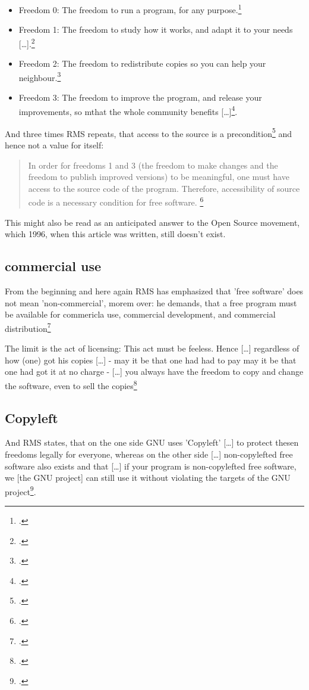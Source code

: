 \documentclass[DIV=calc,BCOR=5mm,11pt,headings=small,oneside,abstract=true, toc=bib]{scrartcl}
\begin{document}
\begin{itemize}
  \item \glqq{}Freedom 0: The freedom to run a program, for any
  purpose.\grqq{}\footcite[cf][41]{Stallman1996a}
  \item \glqq{}Freedom 1: The freedom to study how it works, and adapt it
  to your needs [\ldots].\grqq{}\footcite[cf][41]{Stallman1996a}
  \item \glqq{}Freedom 2: The freedom to redistribute copies so you can
  help your neighbour.\grqq{}\footcite[cf][41]{Stallman1996a}
  \item \glqq{}Freedom 3: The freedom to improve the program, and release your
  improvements, so mthat the whole community benefits
  [\ldots]\grqq{}\footcite[cf][41]{Stallman1996a}.
\end{itemize}

And three times RMS repeats, that \glqq{}access to the source is a
precondition\grqq{}\footcite[cf][41]{Stallman1996a} and hence not a value for
itself:
\begin{quote}
\glqq{}In order for freedoms 1 and 3 (the freedom to make changes and the
freedom to publish improved versions) to be meaningful, one must have access to
the source code of the program. Therefore, accessibility of source code is a
necessary condition for free software.
\grqq{}\footcite[cf][41]{Stallman1996a}
\end{quote}
This might also be read as an anticipated answer to the Open Source movement,
which 1996, when this article was written, still doesn't exist.

\subsection{commercial use}

From the beginning and here again RMS has emphasized that \glqq{}'free
software' does not mean 'non-commercial'\grqq{}, morem over: he demands, that
\glqq{}a free program must be available for commericla use, commercial
development, and commercial distribution\grqq{}\footcite[cf][42]{Stallman1996a}

The limit is the act of licensing: This act must be feeless. Hence
\glqq{}[\ldots] regardless of how (one) got his copies [\ldots]\grqq{} - may it
be that one had had to pay may it be that one had got it at no charge -
\glqq{}[\ldots] you always have the freedom to copy and change the
software, even to sell the copies\grqq{}\footcite[cf][42]{Stallman1996a}

\subsection{Copyleft}

And RMS states, that on the one side GNU uses 'Copyleft' \glqq{}[\ldots] to
protect thesen freedoms legally for everyone\grqq{}, whereas on the other side
\glqq{}[\ldots] non-copylefted free software also exists\grqq{} and that
\glqq{}[\ldots] if your program is non-copylefted free software, we [the
GNU project] can still use it\grqq{} without violating the targets of the GNU
project\footcite[cf][42]{Stallman1996a}.

\small

\end{document}
